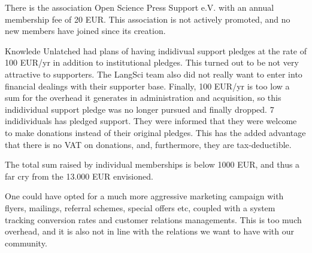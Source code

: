 \documentclass[output=guidelines,nonflat,smallfont,
draftmode
]{langsci/langscibook}
\newcommand{\evaluation}[1]{
  \renewcommand{\tblslinecolour}{lsLightOrange}
  \tblssy{receipt}{Evaluation}{\vspace*{-5mm}#1}
}
\newcommand{\othersolutions}[1]{
  \renewcommand{\tblslinecolour}{lsDarkGreenOne}
  \tblssy{more}{Other solutions}{\vspace*{-5mm}#1}
}
\renewcommand{\tblssy}[4][black!12]{%
  \renewcommand{\langscisymbol}{#2}\renewcommand{\tblsboxcolor}{#1}
  \begin{mdframed}[style=yellowexercise,frametitle={#3}]
    #4
  \end{mdframed}
}
\begin{document}
\evaluation{
There is the association Open Science Press Support e.V. with an annual membership fee of 20 EUR. This association is not actively promoted, and no new members have joined since its creation. 

Knowlede Unlatched had plans of having indidivual support pledges at the rate of 100 EUR/yr in addition to institutional pledges. This turned out to be not very attractive to supporters. The LangSci team also did not really want to enter into financial dealings with their supporter base. Finally, 100 EUR/yr is too low a sum for the overhead it generates in administration and acquisition, so this indidividual support pledge was no longer pursued and finally dropped. 7 indidividuals has pledged support. They were informed that they were welcome to make donations instead of their original pledges. This has the added advantage that there is no VAT on donations, and, furthermore, they are tax-deductible. 

The total sum raised by individual memberships is below 1000 EUR, and thus a far cry from the 13.000 EUR envisioned. 

}
\othersolutions{
One could have opted for a much more aggressive marketing campaign with flyers, mailings, referral schemes, special offers etc, coupled with a system tracking conversion rates and customer relations managements. This is too much overhead, and it is also not in line with the relations we want to have with our community. 
}
\end{document}
